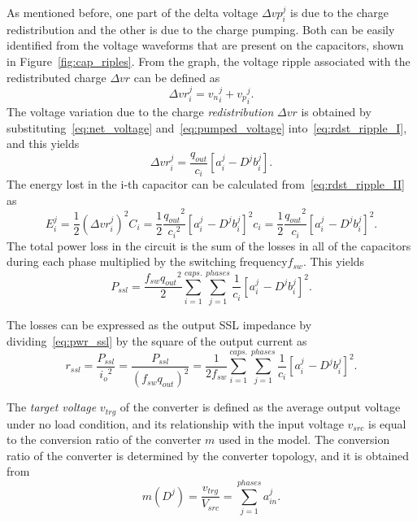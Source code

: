 As mentioned before, one part of the delta voltage $\Delta vp_i^j$ is due to the charge redistribution and the other is due to the charge pumping. Both can be easily identified from the voltage waveforms that are present on the capacitors, shown in Figure~\ref{fig:cap_riples}. From the graph, the voltage ripple associated with the redistributed charge $\Delta vr$ can be defined as
\begin{equation}
\Delta {vr}^j_i  = {v_n}^j_i + {v_p}^j_i .
\label{eq:rdst_ripple_I}
\end{equation}
The voltage variation due to the charge \emph{redistribution} $\Delta vr$  is obtained by substituting~\ref{eq:net_voltage} and~\ref{eq:pumped_voltage} into~\ref{eq:rdst_ripple_I}, and this yields
\begin{equation}
\Delta {vr}^j_i  = \frac{q_{out}}{c_i} \left[ a^j_i - D^j b^j_i \right] .
\label{eq:rdst_ripple_II}
\end{equation}
The energy lost in the i-th capacitor can be calculated from~\ref{eq:rdst_ripple_II} as
\begin{equation}
E_i^j=\frac{1}{2}{({\Delta{vr}}_i^j)}^2C_i=\frac{1}{2}\frac{{q_{out}}^2}{{c_i}^2}{\left[a_{i\
}^j-{D^j} {b_i^j}\right]}^2c_i=\frac{1}{2}\frac{{q_{out}}^2}{c_i}{\left[a_{i\
}^j-{D^j} {b_i^j}\right]}^2 .
\label{eq:e_lost_ssl}
\end{equation}
The total power loss in the circuit is the sum of the losses in all of the
capacitors during each phase multiplied by the switching frequency$f_{sw}$.
This yield{\small s}
\begin{equation}
P_{ssl}=\frac{f_{sw}{q_{out}}^2}{2}\sum_{i=1}^{caps.}\sum_{j=1}^{phases}\frac{1}{c_i}{\left[a_{i\
}^j-{D^j}{b_i^j}\right]}^2.
\label{eq:pwr_ssl}
\end{equation}

The losses can be expressed as the output SSL impedance by dividing~\ref{eq:pwr_ssl} by the
square of the output current as
\begin{equation}
r_{ssl}=\frac{P_{ssl}}{{i_o}^2}=\frac{P_{ssl}}{{(f_{sw} {q_{out}})}^2}=\frac{1}{2 f_{sw}}\sum_{i=1}^{caps.}\sum_{j=1}^{phases}\frac{1}{c_i}{\left[a_{i\
}^j-{D^j} {b_i^j}\right]}^2.
\label{eq:r_ssl}
\end{equation}

The \textit{target voltage }$v_{trg}$ of the converter is defined as the average output voltage under no load condition, and its relationship with the input voltage $v_{src}$ is equal to the conversion ratio of the converter $m$ used in the model. The conversion ratio of the converter is determined by the converter topology, and it is obtained from
\begin{equation}
m(D^j)=\frac{{v_{trg}}}{V_{src}}=\sum_{j=1}^{phases}a_{in}^j.
\label{eq:r_ssl}
\end{equation}

